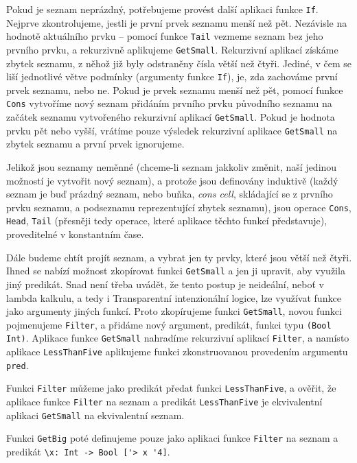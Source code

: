 Pokud je seznam neprázdný, potřebujeme provést další aplikaci funkce \lstinline{If}. Nejprve
zkontrolujeme, jestli je první prvek seznamu menší než pět. Nezávisle na hodnotě aktuálního prvku --
pomocí funkce \lstinline{Tail} vezmeme seznam bez jeho prvního prvku, a rekurzivně aplikujeme
\lstinline{GetSmall}. Rekurzivní aplikací získáme zbytek seznamu, z něhož již byly odstraněny čísla
větší než čtyři. Jediné, v čem se liší jednotlivé větve podmínky (argumenty funkce \lstinline{If}),
je, zda zachováme první prvek seznamu, nebo ne. Pokud je prvek seznamu menší než pět, pomocí funkce
\lstinline{Cons} vytvoříme nový seznam přidáním prvního prvku původního seznamu na začátek seznamu
vytvořeného rekurzivní aplikací \lstinline{GetSmall}. Pokud je hodnota prvku pět nebo vyšší, vrátíme
pouze výsledek rekurzivní aplikace \lstinline{GetSmall} na zbytek seznamu a první prvek ignorujeme.

Jelikož jsou seznamy neměnné (chceme-li seznam jakkoliv změnit, naší jedinou možností je vytvořit
nový seznam), a protože jsou definovány induktivě (každý seznam je buď prázdný seznam, nebo buňka,
\textit{cons cell}, skládající se z prvního prvku seznamu, a podseznamu reprezentující zbytek
seznamu), jsou operace \lstinline{Cons}, \lstinline{Head}, \lstinline{Tail} (přesněji tedy operace,
které aplikace těchto funkcí představuje), proveditelné v konstantním čase.

Dále budeme chtít projít seznam, a vybrat jen ty prvky, které jsou větší než čtyři. Ihned se nabízí
možnost zkopírovat funkci \lstinline{GetSmall} a jen ji upravit, aby využila jiný predikát. Snad
není třeba uvádět, že tento postup je neideální, neboť v lambda kalkulu, a tedy i Transparentní
intenzionální logice, lze využívat funkce jako argumenty jiných funkcí. Proto zkopírujeme funkci
\lstinline{GetSmall}, novou funkci pojmenujeme \lstinline{Filter}, a přidáme nový argument,
predikát, funkci typu \lstinline{(Bool Int)}. Aplikace funkce \lstinline{GetSmall} nahradíme
rekurzivní aplikací \lstinline{Filter}, a namísto aplikace \lstinline{LessThanFive} aplikujeme
funkci zkonstruovanou provedením argumentu \lstinline{pred}.

Funkci \lstinline{Filter} můžeme jako predikát předat funkci \lstinline{LessThanFive}, a ověřit,
že aplikace funkce \lstinline{Filter} na seznam a predikát \lstinline{LessThanFive} je ekvivalentní
aplikaci \lstinline{GetSmall} na ekvivalentní seznam.

Funkci \lstinline{GetBig} poté definujeme pouze jako aplikaci funkce \lstinline{Filter} na seznam
a predikát \lstinline{\x: Int -> Bool ['> x '4]}.

